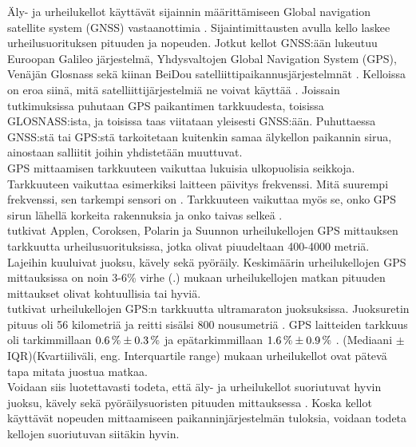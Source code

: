 \documentclass[utf8,bachelor,finnish]{bachelor}
\begin{document}
  Äly- ja urheilukellot käyttävät sijainnin määrittämiseen Global navigation satellite system (GNSS) vastaanottimia \parencite{gilgen-ammann_accuracy_2020}. 
  Sijaintimittausten avulla kello laskee urheilusuorituksen pituuden ja nopeuden. Jotkut kellot 
   GNSS:ään lukeutuu Euroopan Galileo järjestelmä, Yhdysvaltojen Global Navigation System (GPS), Venäjän Glosnass sekä kiinan BeiDou satelliittipaikannusjärjestelmnät \parencite{hofmann2007gnss}.
    Kelloissa on eroa siinä, mitä satelliittijärjestelmiä ne voivat käyttää \parencite{ammann_accuracy_2016}.
    Joissain tutkimuksissa puhutaan GPS paikantimen tarkkuudesta, toisissa GLOSNASS:ista, ja toisissa taas viitataan yleisesti GNSS:ään. Puhuttaessa GNSS:stä tai GPS:stä tarkoitetaan kuitenkin
     samaa älykellon paikannin sirua, ainostaan salliitit joihin yhdistetään muuttuvat. \\

  GPS mittaamisen tarkkuuteen vaikuttaa lukuisia ulkopuolisia seikkoja. Tarkkuuteen vaikuttaa esimerkiksi laitteen päivitys frekvenssi.
   Mitä suurempi frekvenssi, sen tarkempi sensori on \parencite{cummins_global_2013}. Tarkkuuteen vaikuttaa myös
    se, onko GPS sirun lähellä korkeita rakennuksia ja onko taivas selkeä \parencite{baranski_enhancing_2012}. \\

    \textcite{gilgen-ammann_accuracy_2020} tutkivat Applen, Coroksen, Polarin ja Suunnon urheilukellojen GPS mittauksen tarkkuutta urheilusuorituksissa, jotka olivat
      piuudeltaan  400-4000 metriä. Lajeihin kuuluivat juoksu, kävely sekä pyöräily. Keskimäärin urheilukellojen GPS mittauksissa on noin 3-6\% virhe (\textcite{gilgen-ammann_accuracy_2020}.)
      \textcite{gilgen-ammann_accuracy_2020} mukaan urheilukellojen matkan pituuden mittaukset olivat kohtuullisia tai hyviä.\\

  \parencite{johansson_accuracy_2020} tutkivat urheilukellojen GPS:n tarkkuutta ultramaraton juoksuksissa. Juoksuretin pituus oli 56 kilometriä ja reitti sisälsi 800 nousumetriä \parencite{johansson_accuracy_2020}.
    GPS laitteiden tarkkuus oli tarkimmillaan $\SI{0.6 \pm 0.3}{\percent}$ ja epätarkimmillaan $ \SI{1.6 \pm 0.9}{\percent} $ \parencite{johansson_accuracy_2020}. (Mediaani $\pm$ IQR)(Kvartiiliväli, eng. Interquartile range)
     \textcite{johansson_accuracy_2020} mukaan urheilukellot ovat pätevä tapa mitata juostua matkaa.\\

  Voidaan siis luotettavasti todeta, että äly- ja urheilukellot suoriutuvat hyvin juoksu, kävely sekä pyöräilysuoristen pituuden mittauksessa \parencite{gilgen-ammann_accuracy_2020,johansson_accuracy_2020}.
   Koska kellot käyttävät nopeuden mittaamiseen paikanninjärjestelmän tuloksia, voidaan todeta kellojen suoriutuvan siitäkin hyvin.
\end{document}
